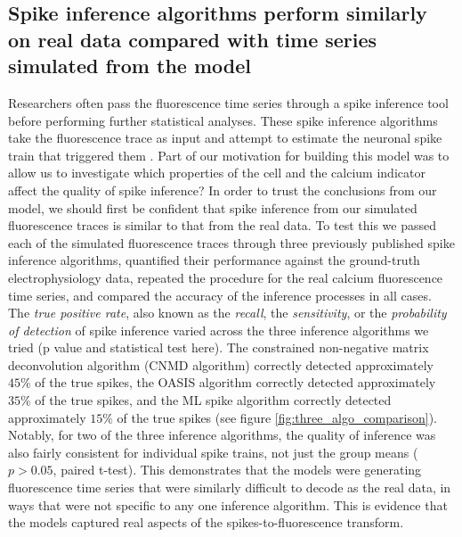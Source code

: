 \subsection{Spike inference algorithms perform similarly on real data compared with time series simulated from the model}
Researchers often pass the fluorescence time series through a spike inference tool before performing further statistical analyses. These spike inference algorithms take the fluorescence trace as input and attempt to estimate the neuronal spike train that triggered them \parencite{vogelstein, pnevmatikakis, friedrich, paninski1, paninski2, deneux}. Part of our motivation for building this model was to allow us to investigate which properties of the cell and the calcium indicator affect the quality of spike inference? In order to trust the conclusions from our model, we should first be confident that spike inference from our simulated fluorescence traces is similar to that from the real data. To test this we passed each of the simulated fluorescence traces through three previously published spike inference algorithms, quantified their performance against the ground-truth electrophysiology data, repeated the procedure for the real calcium fluorescence time series, and compared the accuracy of the inference processes in all cases. The \textit{true positive rate}, also known as the \textit{recall}, the \textit{sensitivity}, or the \textit{probability of detection} of spike inference varied across the three inference algorithms we tried (p value and statistical test here). The constrained non-negative matrix deconvolution algorithm  \parencite{pnevmatikakis} (CNMD algorithm) correctly detected approximately $45\%$ of the true spikes, the OASIS algorithm  \parencite{friedrich} correctly detected approximately $35\%$ of the true spikes, and the ML spike algorithm  \parencite{deneux} correctly detected approximately $15\%$ of the true spikes (see figure \ref{fig:three_algo_comparison}). Notably, for two of the three inference algorithms, the quality of inference was also fairly consistent for individual spike trains, not just the group means ($p > 0.05$, paired t-test). This demonstrates that the models were generating fluorescence time series that were similarly difficult to decode as the real data, in ways that were not specific to any one inference algorithm. This is evidence that the models captured real aspects of the spikes-to-fluorescence transform.
